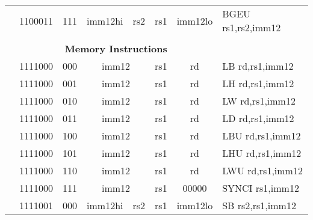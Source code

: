 \begin{table}[p]
\begin{small}
\begin{center}
\begin{tabular}{rcccccccccl}
&
\multicolumn{1}{|c|}{1100011} &
\multicolumn{2}{c|}{111} &
\multicolumn{3}{c|}{imm12hi} &
\multicolumn{1}{c|}{rs2} &
\multicolumn{1}{c|}{rs1} &
\multicolumn{1}{c|}{imm12lo} & BGEU rs1,rs2,imm12 \\
\cline{2-10}
  

&
\multicolumn{9}{c}{} & \\
&
\multicolumn{9}{c}{\bf Memory Instructions} & \\
\cline{2-10}
  

&
\multicolumn{1}{|c|}{1111000} &
\multicolumn{2}{c|}{000} &
\multicolumn{4}{c|}{imm12} &
\multicolumn{1}{c|}{rs1} &
\multicolumn{1}{c|}{rd} & LB rd,rs1,imm12 \\
\cline{2-10}
  

&
\multicolumn{1}{|c|}{1111000} &
\multicolumn{2}{c|}{001} &
\multicolumn{4}{c|}{imm12} &
\multicolumn{1}{c|}{rs1} &
\multicolumn{1}{c|}{rd} & LH rd,rs1,imm12 \\
\cline{2-10}
  

&
\multicolumn{1}{|c|}{1111000} &
\multicolumn{2}{c|}{010} &
\multicolumn{4}{c|}{imm12} &
\multicolumn{1}{c|}{rs1} &
\multicolumn{1}{c|}{rd} & LW rd,rs1,imm12 \\
\cline{2-10}
  

&
\multicolumn{1}{|c|}{1111000} &
\multicolumn{2}{c|}{011} &
\multicolumn{4}{c|}{imm12} &
\multicolumn{1}{c|}{rs1} &
\multicolumn{1}{c|}{rd} & LD rd,rs1,imm12 \\
\cline{2-10}
  

&
\multicolumn{1}{|c|}{1111000} &
\multicolumn{2}{c|}{100} &
\multicolumn{4}{c|}{imm12} &
\multicolumn{1}{c|}{rs1} &
\multicolumn{1}{c|}{rd} & LBU rd,rs1,imm12 \\
\cline{2-10}
  

&
\multicolumn{1}{|c|}{1111000} &
\multicolumn{2}{c|}{101} &
\multicolumn{4}{c|}{imm12} &
\multicolumn{1}{c|}{rs1} &
\multicolumn{1}{c|}{rd} & LHU rd,rs1,imm12 \\
\cline{2-10}
  

&
\multicolumn{1}{|c|}{1111000} &
\multicolumn{2}{c|}{110} &
\multicolumn{4}{c|}{imm12} &
\multicolumn{1}{c|}{rs1} &
\multicolumn{1}{c|}{rd} & LWU rd,rs1,imm12 \\
\cline{2-10}
  

&
\multicolumn{1}{|c|}{1111000} &
\multicolumn{2}{c|}{111} &
\multicolumn{4}{c|}{imm12} &
\multicolumn{1}{c|}{rs1} &
\multicolumn{1}{c|}{00000} & SYNCI rs1,imm12 \\
\cline{2-10}
  

&
\multicolumn{1}{|c|}{1111001} &
\multicolumn{2}{c|}{000} &
\multicolumn{3}{c|}{imm12hi} &
\multicolumn{1}{c|}{rs2} &
\multicolumn{1}{c|}{rs1} &
\multicolumn{1}{c|}{imm12lo} & SB rs2,rs1,imm12 \\
\cline{2-10}
  


\end{tabular}
\end{center}
\end{small}
\end{table}
